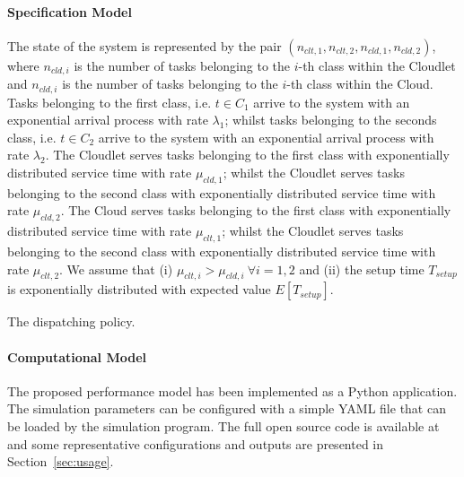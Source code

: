 \paragraph{Specification Model}
The state of the system is represented by the pair $(n_{clt,1},n_{clt,2},n_{cld,1},n_{cld,2})$, where $n_{cld,i}$ is the number of tasks belonging to the $i$-th class within the Cloudlet and $n_{cld,i}$ is the number of tasks belonging to the $i$-th class within the Cloud.
Tasks belonging to the first class, i.e. $t\in C_{1}$ arrive to the system with an exponential arrival process with rate $ \lambda_{1}$; whilst tasks belonging to the seconds class, i.e. $t\in C_{2}$ arrive to the system with an exponential arrival process with rate $ \lambda_{2}$.
The Cloudlet serves tasks belonging to the first class with exponentially distributed service time with rate $\mu_{cld,1}$; whilst the Cloudlet serves tasks belonging to the second class with exponentially distributed service time with rate $\mu_{cld,2}$.
The Cloud serves tasks belonging to the first class with exponentially distributed service time with rate $\mu_{clt,1}$; whilst the Cloudlet serves tasks belonging to the second class with exponentially distributed service time with rate $\mu_{clt,2}$.
We assume that 
(i) $\mu_{clt,i}>\mu_{cld,i}\ \forall i=1,2$ and
(ii) the setup time $T_{setup}$ is exponentially distributed with expected value $E[T_{setup}]$.

\begin{algorithm}
	\SetAlgoLined
	\caption{The dispatching policy.}
	\label{alg:modeling-dispatching-policy}
\end{algorithm}

\paragraph{Computational Model}
The proposed performance model has been implemented as a Python application. 
The simulation parameters can be configured with a simple YAML file that can be loaded by the simulation program.
The full open source code is available at \cite{gmarciani-pydes} and some representative configurations and outputs are presented in Section~\ref{sec:usage}.

